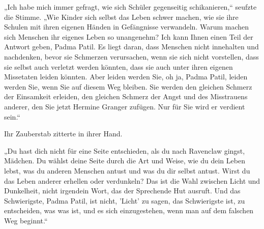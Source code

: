 „Ich habe mich immer gefragt, wie sich Schüler gegenseitig schikanieren,“ seufzte die Stimme. „Wie Kinder sich selbst das Leben schwer machen, wie sie ihre Schulen mit ihren eigenen Händen in Gefängnisse verwandeln. Warum machen sich Menschen ihr eigenes Leben so unangenehm? Ich kann Ihnen einen Teil der Antwort geben, Padma Patil. Es liegt daran, dass Menschen nicht innehalten und nachdenken, bevor sie Schmerzen verursachen, wenn sie sich nicht vorstellen, dass sie selbst auch verletzt werden könnten, dass sie auch unter ihren eigenen Missetaten leiden könnten. Aber leiden werden Sie, oh ja, Padma Patil, leiden werden Sie, wenn Sie auf diesem Weg bleiben. Sie werden den gleichen Schmerz der Einsamkeit erleiden, den gleichen Schmerz der Angst und des Misstrauens anderer, den Sie jetzt Hermine Granger zufügen. Nur für Sie wird er verdient sein.“

Ihr Zauberstab zitterte in ihrer Hand.

„Du hast dich nicht für eine Seite entschieden, als du nach Ravenclaw gingst, Mädchen. Du wählst deine Seite durch die Art und Weise, wie du dein Leben lebst, was du anderen Menschen antust und was du dir selbst antust. Wirst du das Leben anderer erhellen oder verdunkeln? Das ist die Wahl zwischen Licht und Dunkelheit, nicht irgendein Wort, das der Sprechende Hut ausruft. Und das Schwierigste, Padma Patil, ist nicht, 'Licht' zu sagen, das Schwierigste ist, zu entscheiden, was was ist, und es sich einzugestehen, wenn man auf dem falschen Weg beginnt.“

